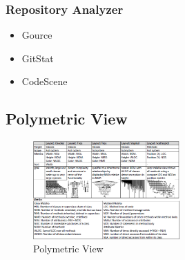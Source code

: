 \subsubsection{Repository Analyzer}
\begin{itemize}
    \item Gource
    \item GitStat
    \item CodeScene
\end{itemize}


\hypertarget{Polymetric View}{%
\subsection{Polymetric View}\label{Polymetric-View}}
\begin{figure}[H]
\centering
\includegraphics[width=0.5\textwidth]{figures/Polymetric.PNG}
\caption{Polymetric View}
\end{figure}
\clearpage

